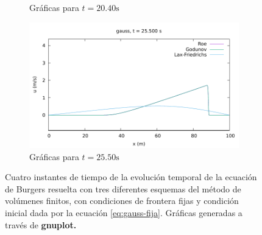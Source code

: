 \documentclass[12pt]{article}
\begin{document}
\begin{figure}[ht]
\begin{subfigure}[b]{0.4\textwidth}
 			\caption*{Gráficas para $t=20.40\unit{\second}$}
 			\label{fig:gauss-fija5}
 		\end{subfigure}
 		\hfill
 		\begin{subfigure}[b]{0.4\textwidth}
 			\includegraphics[width=\textwidth]{../burgers1DVF/results/sol_fijas/gauss/850.pdf}
 			\caption*{Gráficas para $t=25.50\unit{\second}$}
 			\label{fig:gauss-fija6}
 		\end{subfigure}
 		\caption{Cuatro instantes de tiempo de la evolución temporal de la ecuación de Burgers resuelta con tres diferentes esquemas del método de volúmenes finitos, con condiciones de frontera fijas y condición inicial dada por la ecuación \ref{eq:gauss-fija}. Gráficas generadas a través de \textbf{gnuplot.}}
 		\label{fig:instantes-gauss-fija}
	\end{figure}
 
\end{document}
